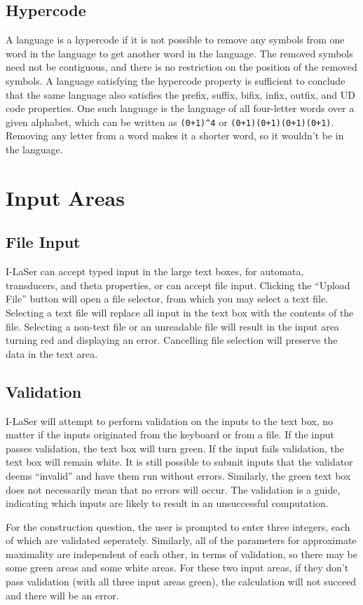 \documentclass{article}
\begin{document}
\subsection{Hypercode}
A language is a hypercode if it is not possible to remove any symbols from one word in the language to get another word in the language. The removed symbols need not be contiguous, and there is no restriction on the position of the removed symbols. A language satisfying the hypercode property is sufficient to conclude that the same language also satisfies the prefix, suffix, bifix, infix, outfix, and UD code properties. One such language is the language of all four-letter words over a given alphabet, which can be written as \verb-(0+1)^4- or \verb-(0+1)(0+1)(0+1)(0+1)-. Removing any letter from a word makes it a shorter word, so it wouldn't be in the language.

\section{Input Areas}

\subsection{File Input}
I-LaSer can accept typed input in the large text boxes, for automata, transducers, and theta properties, or can accept file input. Clicking the ``Upload File'' button will open a file selector, from which you may select a text file. Selecting a text file will replace all input in the text box with the contents of the file. Selecting a non-text file or an unreadable file will result in the input area turning red and displaying an error. Cancelling file selection will preserve the data in the text area.

\subsection{Validation}
I-LaSer will attempt to perform validation on the inputs to the text box, no matter if the inputs originated from the keyboard or from a file. If the input passes validation, the text box will turn green. If the input fails validation, the text box will remain white. It is still possible to submit inputs that the validator deems ``invalid'' and have them run without errors. Similarly, the green text box does not necessarily mean that no errors will occur.
The validation is a guide, indicating which inputs are likely to result in an unsuccessful computation.
\par For the construction question, the user is prompted to enter three integers, each of which are validated seperately.
Similarly, all of the parameters for approximate maximality are independent of each other, in terms of validation, so there may be some green areas and some white areas.
For these two input areas, if they don't pass validation (with all three input areas green), the calculation will not succeed and there will be an error.
\end{document}
